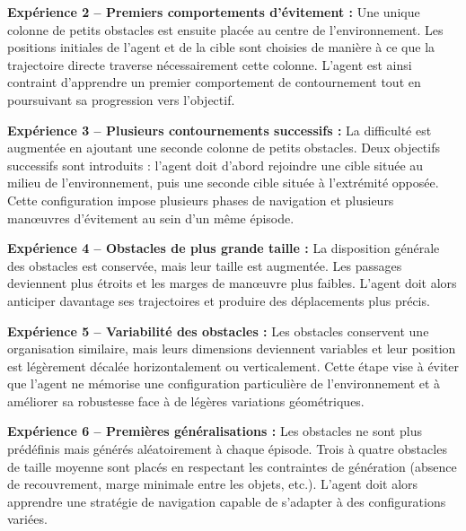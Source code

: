 \vspace{10pt}

\noindent \textbf{Expérience 2 -- Premiers comportements d'évitement :} Une unique colonne de petits obstacles est ensuite placée au centre de l'environnement. Les positions initiales de l'agent et de la cible sont choisies de manière à ce que la trajectoire directe traverse nécessairement cette colonne. L'agent est ainsi contraint d'apprendre un premier comportement de contournement tout en poursuivant sa progression vers l'objectif.

\vspace{10pt}

\noindent \textbf{Expérience 3 -- Plusieurs contournements successifs :} La difficulté est augmentée en ajoutant une seconde colonne de petits obstacles. Deux objectifs successifs sont introduits : l'agent doit d'abord rejoindre une cible située au milieu de l'environnement, puis une seconde cible située à l'extrémité opposée. Cette configuration impose plusieurs phases de navigation et plusieurs manœuvres d'évitement au sein d'un même épisode.

\vspace{10pt}

\noindent \textbf{Expérience 4 -- Obstacles de plus grande taille :} La disposition générale des obstacles est conservée, mais leur taille est augmentée. Les passages deviennent plus étroits et les marges de manœuvre plus faibles. L'agent doit alors anticiper davantage ses trajectoires et produire des déplacements plus précis.

\vspace{10pt}

\noindent \textbf{Expérience 5 -- Variabilité des obstacles :} Les obstacles conservent une organisation similaire, mais leurs dimensions deviennent variables et leur position est légèrement décalée horizontalement ou verticalement. Cette étape vise à éviter que l'agent ne mémorise une configuration particulière de l'environnement et à améliorer sa robustesse face à de légères variations géométriques.

\vspace{10pt}

\noindent \textbf{Expérience 6 -- Premières généralisations :} Les obstacles ne sont plus prédéfinis mais générés aléatoirement à chaque épisode. Trois à quatre obstacles de taille moyenne sont placés en respectant les contraintes de génération (absence de recouvrement, marge minimale entre les objets, etc.). L'agent doit alors apprendre une stratégie de navigation capable de s'adapter à des configurations variées.

